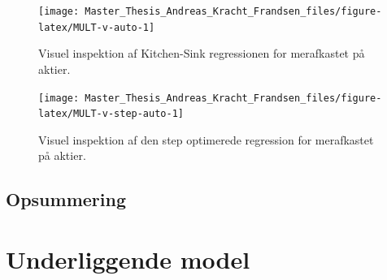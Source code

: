 \documentclass[
  a4paper,
  oneside]{memoir}
\begin{document}
\begin{table}[H]
\begin{threeparttable}
\begin{tablenotes}
\end{tablenotes}
\end{threeparttable}
\end{table}

\begin{figure}[H]

{\centering \texttt{[image: Master\_Thesis\_Andreas\_Kracht\_Frandsen\_files/figure-latex/MULT-v-auto-1]} 

}

\caption{Visuel inspektion af Kitchen-Sink regressionen for merafkastet på aktier.}\label{fig:MULT-v-auto}
\end{figure}

\begin{figure}[H]

{\centering \texttt{[image: Master\_Thesis\_Andreas\_Kracht\_Frandsen\_files/figure-latex/MULT-v-step-auto-1]} 

}

\caption{Visuel inspektion af den step optimerede regression for merafkastet på aktier.}\label{fig:MULT-v-step-auto}
\end{figure}

\hypertarget{opsreg}{%
\section{Opsummering}\label{opsreg}}

\hypertarget{underliggende-model}{%
\chapter{Underliggende model}\label{underliggende-model}}
\end{document}
